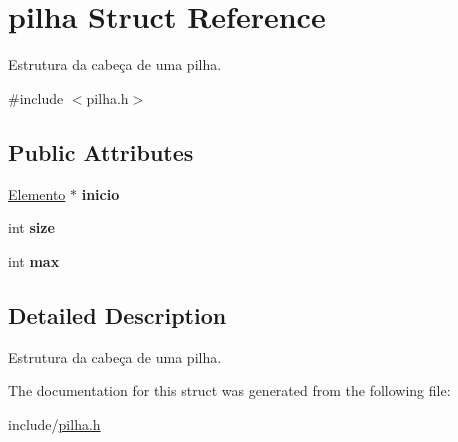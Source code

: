 \hypertarget{structpilha}{}\section{pilha Struct Reference}
\label{structpilha}


Estrutura da cabeça de uma pilha.  




{\ttfamily \#include $<$pilha.\+h$>$}

\subsection*{Public Attributes}
\begin{DoxyCompactItemize}
\item 
\mbox{\label{structpilha_ae1f70063014c54f52ece835d1cb19406}} 
\mbox{\hyperlink{pilha_8h_aa472ad5ba3a076fcce5ed442b8f8052d}{Elemento}} $\ast$ {\bfseries inicio}
\item 
\mbox{\label{structpilha_ab6f3f9be9c7f94fd0630d4ab5552babe}} 
int {\bfseries size}
\item 
\mbox{\label{structpilha_a3f205f879db44103326097d85b3608fe}} 
int {\bfseries max}
\end{DoxyCompactItemize}


\subsection{Detailed Description}
Estrutura da cabeça de uma pilha. 

The documentation for this struct was generated from the following file\+:\begin{DoxyCompactItemize}
\item 
include/\mbox{\hyperlink{pilha_8h}{pilha.\+h}}\end{DoxyCompactItemize}
